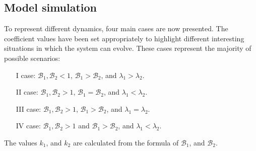 \subsection{Model simulation}
To represent different dynamics, four main cases are now presented. The coefficient values have been set appropriately to highlight different interesting situations in which the system can evolve. These cases represent the majority of possible scenarios:

\begin{itemize}
	\item[I] case: $\mathcal{B}_1, \mathcal{B}_2 <1$, $\mathcal{B}_1 >  \mathcal{B}_2$, and $\lambda_1 > \lambda_2$.
	\item[II] case: $\mathcal{B}_1, \mathcal{B}_2 >1$, $\mathcal{B}_1 =  \mathcal{B}_2$, and $\lambda_1 < \lambda_2$.
	\item[III] case: $\mathcal{B}_1, \mathcal{B}_2 >1$, $\mathcal{B}_1 >  \mathcal{B}_2$, and $\lambda_1 = \lambda_2$.
	\item[IV] case: $\mathcal{B}_1, \mathcal{B}_2 >1$ and $\mathcal{B}_1 >  \mathcal{B}_2$, and $\lambda_1 < \lambda_2$.
\end{itemize}

The values $k_1$, and $k_2$ are calculated from the formula of $\mathcal{B}_1$, and $\mathcal{B}_2$.

